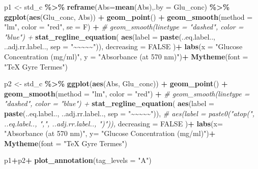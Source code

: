 \documentclass[
  12pt,
]{article}
\newenvironment{Shaded}{\begin{snugshade}}{\end{snugshade}}
\newcommand{\AttributeTok}[1]{\textcolor[rgb]{0.13,0.29,0.53}{#1}}
\newcommand{\CommentTok}[1]{\textcolor[rgb]{0.56,0.35,0.01}{\textit{#1}}}
\newcommand{\ConstantTok}[1]{\textcolor[rgb]{0.56,0.35,0.01}{#1}}
\newcommand{\FunctionTok}[1]{\textcolor[rgb]{0.13,0.29,0.53}{\textbf{#1}}}
\newcommand{\NormalTok}[1]{#1}
\newcommand{\OtherTok}[1]{\textcolor[rgb]{0.56,0.35,0.01}{#1}}
\newcommand{\SpecialCharTok}[1]{\textcolor[rgb]{0.81,0.36,0.00}{\textbf{#1}}}
\newcommand{\StringTok}[1]{\textcolor[rgb]{0.31,0.60,0.02}{#1}}
\begin{document}
\begin{Shaded}
\begin{Highlighting}[]
\NormalTok{p1 }\OtherTok{\textless{}{-}}\NormalTok{ std\_c }\SpecialCharTok{\%\textgreater{}\%} \FunctionTok{reframe}\NormalTok{(}\AttributeTok{Abs=}\FunctionTok{mean}\NormalTok{(Abs),}\AttributeTok{.by =}\NormalTok{ Glu\_conc) }\SpecialCharTok{\%\textgreater{}\%} 
  \FunctionTok{ggplot}\NormalTok{(}\FunctionTok{aes}\NormalTok{(Glu\_conc, Abs)) }\SpecialCharTok{+}
  \FunctionTok{geom\_point}\NormalTok{() }\SpecialCharTok{+}
  \FunctionTok{geom\_smooth}\NormalTok{(}\AttributeTok{method =} \StringTok{"lm"}\NormalTok{, }\AttributeTok{color =} \StringTok{"red"}\NormalTok{, }\AttributeTok{se =}\NormalTok{ F) }\SpecialCharTok{+}
  \CommentTok{\# geom\_smooth(linetype = "dashed", color = "blue") +}
  \FunctionTok{stat\_regline\_equation}\NormalTok{(}
    \FunctionTok{aes}\NormalTok{(}\AttributeTok{label =} \FunctionTok{paste}\NormalTok{(..eq.label..,}
\NormalTok{                      ..adj.rr.label..,}
                      \AttributeTok{sep =} \StringTok{"\textasciitilde{}\textasciitilde{}\textasciitilde{}\textasciitilde{}\textasciitilde{}"}\NormalTok{)),}
    \AttributeTok{decreasing =} \ConstantTok{FALSE}
\NormalTok{  )}\SpecialCharTok{+}
  \FunctionTok{labs}\NormalTok{(}\AttributeTok{x =} \StringTok{"Glucose Concentration (mg/ml)"}\NormalTok{,}
       \AttributeTok{y =} \StringTok{"Absorbance (at 570 nm)"}\NormalTok{)}\SpecialCharTok{+}
  \FunctionTok{Mytheme}\NormalTok{(}\AttributeTok{font =} \StringTok{"TeX Gyre Termes"}\NormalTok{)}
  

\NormalTok{p2 }\OtherTok{\textless{}{-}}\NormalTok{ std\_c }\SpecialCharTok{\%\textgreater{}\%} \FunctionTok{ggplot}\NormalTok{(}\FunctionTok{aes}\NormalTok{(Abs, Glu\_conc)) }\SpecialCharTok{+}
  \FunctionTok{geom\_point}\NormalTok{() }\SpecialCharTok{+}
  \FunctionTok{geom\_smooth}\NormalTok{(}\AttributeTok{method =} \StringTok{"lm"}\NormalTok{, }\AttributeTok{color =} \StringTok{"red"}\NormalTok{) }\SpecialCharTok{+}
  \CommentTok{\# geom\_smooth(linetype = "dashed", color = "blue") +}
  \FunctionTok{stat\_regline\_equation}\NormalTok{(}
    \FunctionTok{aes}\NormalTok{(}\AttributeTok{label =} \FunctionTok{paste}\NormalTok{(..eq.label..,}
\NormalTok{                      ..adj.rr.label..,}
                      \AttributeTok{sep =} \StringTok{"\textasciitilde{}\textasciitilde{}\textasciitilde{}\textasciitilde{}\textasciitilde{}"}\NormalTok{)),}
    \CommentTok{\# aes(label = paste0("atop(", ..eq.label.., ",", ..adj.rr.label.., ")")),}
    \AttributeTok{decreasing =} \ConstantTok{FALSE}
\NormalTok{  )}\SpecialCharTok{+}
  \FunctionTok{labs}\NormalTok{(}\AttributeTok{x=} \StringTok{"Absorbance (at 570 nm)"}\NormalTok{,}
       \AttributeTok{y=} \StringTok{"Glucose Concentration (mg/ml)"}\NormalTok{)}\SpecialCharTok{+}
  \FunctionTok{Mytheme}\NormalTok{(}\AttributeTok{font =} \StringTok{"TeX Gyre Termes"}\NormalTok{)}

\NormalTok{p1}\SpecialCharTok{+}\NormalTok{p2}\SpecialCharTok{+}
  \FunctionTok{plot\_annotation}\NormalTok{(}\AttributeTok{tag\_levels =} \StringTok{"A"}\NormalTok{)}
\end{Highlighting}
\end{Shaded}
\end{document}
